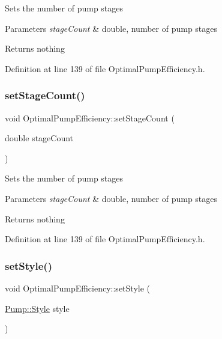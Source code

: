 Sets the number of pump stages


\begin{DoxyParams}{Parameters}
{\em stage\+Count} & double, number of pump stages\\
\hline
\end{DoxyParams}
\begin{DoxyReturn}{Returns}
nothing 
\end{DoxyReturn}


Definition at line 139 of file Optimal\+Pump\+Efficiency.\+h.

\mbox{\label{class_optimal_pump_efficiency_a5b0b2a24a87c1c8fc92aa96c6ba4b727}} 
\subsubsection{\texorpdfstring{set\+Stage\+Count()}{setStageCount()}\hspace{0.1cm}{\footnotesize\ttfamily [3/3]}}
{\footnotesize\ttfamily void Optimal\+Pump\+Efficiency\+::set\+Stage\+Count (\begin{DoxyParamCaption}\item[{double}]{stage\+Count }\end{DoxyParamCaption})\hspace{0.3cm}{\ttfamily [inline]}}

Sets the number of pump stages


\begin{DoxyParams}{Parameters}
{\em stage\+Count} & double, number of pump stages\\
\hline
\end{DoxyParams}
\begin{DoxyReturn}{Returns}
nothing 
\end{DoxyReturn}


Definition at line 139 of file Optimal\+Pump\+Efficiency.\+h.

\mbox{\label{class_optimal_pump_efficiency_ab6b85c8c08d6641c5375c65436f16a2f}} 
\subsubsection{\texorpdfstring{set\+Style()}{setStyle()}\hspace{0.1cm}{\footnotesize\ttfamily [1/3]}}
{\footnotesize\ttfamily void Optimal\+Pump\+Efficiency\+::set\+Style (\begin{DoxyParamCaption}\item[{\hyperlink{class_pump_aef354601ce4218258cc898b35a1e90ff}{Pump\+::\+Style}}]{style }\end{DoxyParamCaption})\hspace{0.3cm}{\ttfamily [inline]}}

